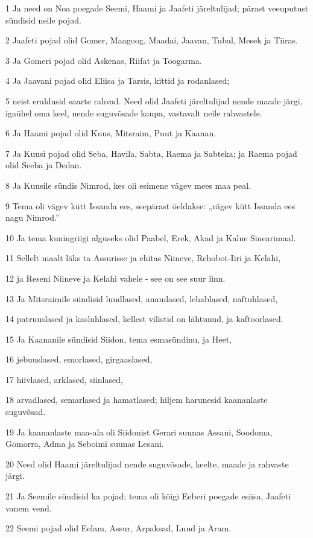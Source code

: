 \par 1 Ja need on Noa poegade Seemi, Haami ja Jaafeti järeltulijad; pärast veeuputust sündisid neile pojad.
\par 2 Jaafeti pojad olid Gomer, Maagoog, Maadai, Jaavan, Tubal, Mesek ja Tiiras.
\par 3 Ja Gomeri pojad olid Askenas, Riifat ja Toogarma.
\par 4 Ja Jaavani pojad olid Eliisa ja Tarsis, kittid ja rodanlased;
\par 5 neist eraldusid saarte rahvad. Need olid Jaafeti järeltulijad nende maade järgi, igaühel oma keel, nende suguvõsade kaupa, vastavalt neile rahvastele.
\par 6 Ja Haami pojad olid Kuus, Mitsraim, Puut ja Kaanan.
\par 7 Ja Kuusi pojad olid Seba, Havila, Sabta, Raema ja Sabteka; ja Raema pojad olid Seeba ja Dedan.
\par 8 Ja Kuusile sündis Nimrod, kes oli esimene vägev mees maa peal.
\par 9 Tema oli vägev kütt Issanda ees, seepärast öeldakse: „vägev kütt Issanda ees nagu Nimrod.”
\par 10 Ja tema kuningriigi alguseks olid Paabel, Erek, Akad ja Kalne Sinearimaal.
\par 11 Sellelt maalt läks ta Assurisse ja ehitas Niineve, Rehobot-Iiri ja Kelahi,
\par 12 ja Reseni Niineve ja Kelahi vahele - see on see suur linn.
\par 13 Ja Mitsraimile sündisid luudlased, anamlased, lehablased, naftuhlased,
\par 14 patruuslased ja kasluhlased, kellest vilistid on lähtunud, ja kaftoorlased.
\par 15 Ja Kaananile sündisid Siidon, tema esmasündinu, ja Heet,
\par 16 jebuuslased, emorlased, girgaaslased,
\par 17 hiivlased, arklased, siinlased,
\par 18 arvadlased, semarlased ja hamatlased; hiljem harunesid kaananlaste suguvõsad.
\par 19 Ja kaananlaste maa-ala oli Siidonist Gerari suunas Assani, Soodoma, Gomorra, Adma ja Seboimi suunas Lesani.
\par 20 Need olid Haami järeltulijad nende suguvõsade, keelte, maade ja rahvaste järgi.
\par 21 Ja Seemile sündisid ka pojad; tema oli kõigi Eeberi poegade esiisa, Jaafeti vanem vend.
\par 22 Seemi pojad olid Eelam, Assur, Arpaksad, Luud ja Aram.
